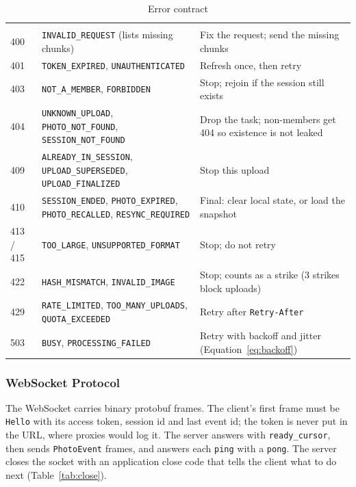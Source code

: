 \begin{table}[H]
\centering
\small\stripes
\begin{tabularx}{\linewidth}{C{1.0cm}L{6.2cm}Y}
\headrow {} &  & \\
400 & \texttt{INVALID\_REQUEST} (lists missing chunks) & Fix the request; send the missing chunks \\
401 & \texttt{TOKEN\_EXPIRED}, \texttt{UNAUTHENTICATED} & Refresh once, then retry \\
403 & \texttt{NOT\_A\_MEMBER}, \texttt{FORBIDDEN} & Stop; rejoin if the session still exists \\
404 & \texttt{UNKNOWN\_UPLOAD}, \texttt{PHOTO\_NOT\_FOUND}, \texttt{SESSION\_NOT\_FOUND} & Drop the task; non-members get 404 so existence is not leaked \\
409 & \texttt{ALREADY\_IN\_SESSION}, \texttt{UPLOAD\_SUPERSEDED}, \texttt{UPLOAD\_FINALIZED} & Stop this upload \\
410 & \texttt{SESSION\_ENDED}, \texttt{PHOTO\_EXPIRED}, \texttt{PHOTO\_RECALLED}, \texttt{RESYNC\_REQUIRED} & Final: clear local state, or load the snapshot \\
413 / 415 & \texttt{TOO\_LARGE}, \texttt{UNSUPPORTED\_FORMAT} & Stop; do not retry \\
422 & \texttt{HASH\_MISMATCH}, \texttt{INVALID\_IMAGE} & Stop; counts as a strike (3 strikes block uploads) \\
429 & \texttt{RATE\_LIMITED}, \texttt{TOO\_MANY\_UPLOADS}, \texttt{QUOTA\_EXCEEDED} & Retry after \texttt{Retry-After} \\
503 & \texttt{BUSY}, \texttt{PROCESSING\_FAILED} & Retry with backoff and jitter (Equation~\ref{eq:backoff}) \\
\end{tabularx}
\caption{Error contract}\label{tab:errors}
\end{table}

\subsubsection{WebSocket Protocol}

The WebSocket carries binary protobuf frames. The client's first frame must be \texttt{Hello} with its access token, session id and last event id; the token is never put in the URL, where proxies would log it. The server answers with \texttt{ready\_cursor}, then sends \texttt{PhotoEvent} frames, and answers each \texttt{ping} with a \texttt{pong}. The server closes the socket with an application close code that tells the client what to do next (Table~\ref{tab:close}).

